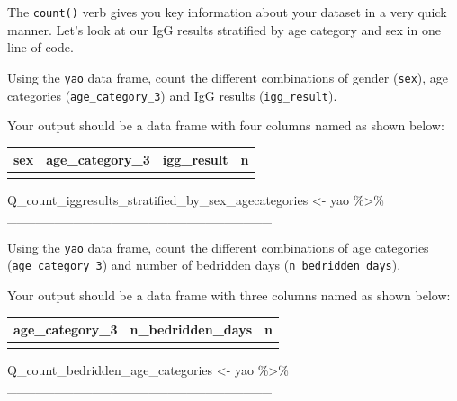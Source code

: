 \documentclass[
  letterpaper,
  DIV=11,
  numbers=noendperiod]{scrreprt}
\newenvironment{Shaded}{\begin{snugshade}}{\end{snugshade}}
\newcommand{\NormalTok}[1]{\textcolor[rgb]{0.00,0.23,0.31}{#1}}
\newcommand{\OtherTok}[1]{\textcolor[rgb]{0.00,0.23,0.31}{#1}}
\newcommand{\SpecialCharTok}[1]{\textcolor[rgb]{0.37,0.37,0.37}{#1}}
\begin{document}
\begin{tcolorbox}[enhanced jigsaw, titlerule=0mm, colback=white, left=2mm, breakable, opacitybacktitle=0.6, colbacktitle=quarto-callout-tip-color!10!white, colframe=quarto-callout-tip-color-frame, bottomtitle=1mm, opacityback=0, coltitle=black, arc=.35mm, toptitle=1mm, title=\textcolor{quarto-callout-tip-color}{\faLightbulb}\hspace{0.5em}{Practice}, leftrule=.75mm, toprule=.15mm, bottomrule=.15mm, rightrule=.15mm]

The \texttt{count()} verb gives you key information about your dataset
in a very quick manner. Let's look at our IgG results stratified by age
category and sex in one line of code.

Using the \texttt{yao} data frame, count the different combinations of
gender (\texttt{sex}), age categories (\texttt{age\_category\_3}) and
IgG results (\texttt{igg\_result}).

Your output should be a data frame with four columns named as shown
below:

\begin{longtable}[]{@{}llll@{}}
\toprule\noalign{}
sex & age\_category\_3 & igg\_result & n \\
\midrule\noalign{}
\endhead
\bottomrule\noalign{}
\endlastfoot
& & & \\
\end{longtable}

\begin{Shaded}
\begin{Highlighting}[]
\NormalTok{Q\_count\_iggresults\_stratified\_by\_sex\_agecategories }\OtherTok{\textless{}{-}} 
\NormalTok{  yao }\SpecialCharTok{\%\textgreater{}\%}
\NormalTok{  \_\_\_\_\_\_\_\_\_\_\_\_\_\_\_\_\_\_\_\_\_\_\_\_\_\_\_\_}
\end{Highlighting}
\end{Shaded}

Using the \texttt{yao} data frame, count the different combinations of
age categories (\texttt{age\_category\_3}) and number of bedridden days
(\texttt{n\_bedridden\_days}).

Your output should be a data frame with three columns named as shown
below:

\begin{longtable}[]{@{}lll@{}}
\toprule\noalign{}
age\_category\_3 & n\_bedridden\_days & n \\
\midrule\noalign{}
\endhead
\bottomrule\noalign{}
\endlastfoot
& & \\
\end{longtable}

\begin{Shaded}
\begin{Highlighting}[]
\NormalTok{Q\_count\_bedridden\_age\_categories }\OtherTok{\textless{}{-}} 
\NormalTok{  yao }\SpecialCharTok{\%\textgreater{}\%}
\NormalTok{  \_\_\_\_\_\_\_\_\_\_\_\_\_\_\_\_\_\_\_\_\_\_\_\_\_\_\_\_}
\end{Highlighting}
\end{Shaded}

\end{tcolorbox}
\end{document}
